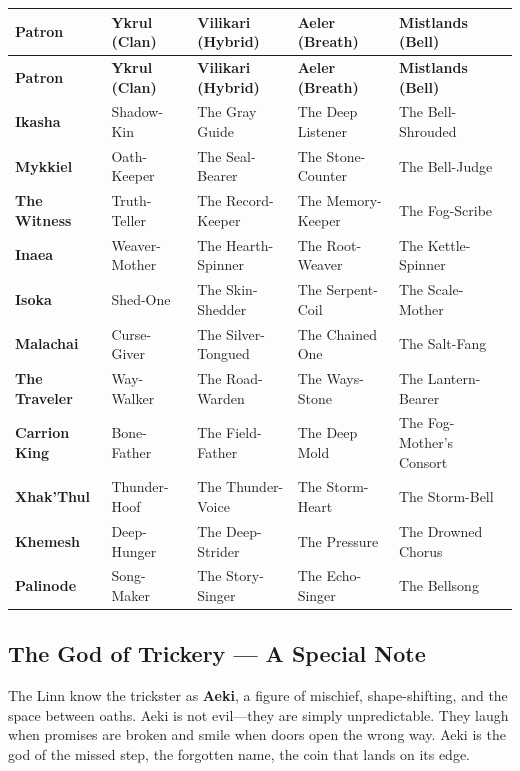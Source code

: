 \begin{longtable}{p{3cm}|p{2.5cm}|p{3cm}|p{2.5cm}|p{2.5cm}}
\toprule
\textbf{Patron} & \textbf{Ykrul (Clan)} & \textbf{Vilikari (Hybrid)} & \textbf{Aeler (Breath)} & \textbf{Mistlands (Bell)} \\
\midrule
\endfirsthead
\toprule
\textbf{Patron} & \textbf{Ykrul (Clan)} & \textbf{Vilikari (Hybrid)} & \textbf{Aeler (Breath)} & \textbf{Mistlands (Bell)} \\
\midrule
\endhead
\bottomrule
\endfoot
\textbf{Ikasha} & Shadow-Kin & The Gray Guide & The Deep Listener & The Bell-Shrouded \\
\textbf{Mykkiel} & Oath-Keeper & The Seal-Bearer & The Stone-Counter & The Bell-Judge \\
\textbf{The Witness} & Truth-Teller & The Record-Keeper & The Memory-Keeper & The Fog-Scribe \\
\textbf{Inaea} & Weaver-Mother & The Hearth-Spinner & The Root-Weaver & The Kettle-Spinner \\
\textbf{Isoka} & Shed-One & The Skin-Shedder & The Serpent-Coil & The Scale-Mother \\
\textbf{Malachai} & Curse-Giver & The Silver-Tongued & The Chained One & The Salt-Fang \\
\textbf{The Traveler} & Way-Walker & The Road-Warden & The Ways-Stone & The Lantern-Bearer \\
\textbf{Carrion King} & Bone-Father & The Field-Father & The Deep Mold & The Fog-Mother's Consort \\
\textbf{Xhak'Thul} & Thunder-Hoof & The Thunder-Voice & The Storm-Heart & The Storm-Bell \\
\textbf{Khemesh} & Deep-Hunger & The Deep-Strider & The Pressure & The Drowned Chorus \\
\textbf{Palinode} & Song-Maker & The Story-Singer & The Echo-Singer & The Bellsong \\
\bottomrule
\end{longtable}

\subsection{The God of Trickery --- A Special Note}

The Linn know the trickster as \textbf{Aeki}, a figure of mischief, shape-shifting, and the space between oaths. Aeki is not evil---they are simply unpredictable. They laugh when promises are broken and smile when doors open the wrong way. Aeki is the god of the missed step, the forgotten name, the coin that lands on its edge.

